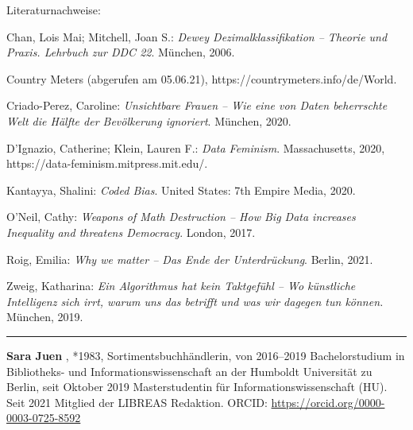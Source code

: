 \documentclass[a4paper,
fontsize=11pt,
oneside,
numbers=noperiodatend,
parskip=half-,
bibliography=totoc,
final
]{scrartcl}
\begin{document}
Literaturnachweise:

Chan, Lois Mai; Mitchell, Joan S.: \emph{Dewey Dezimalklassifikation --
Theorie und Praxis. Lehrbuch zur DDC 22}. München, 2006.

Country Meters (abgerufen am 05.06.21),
https://countrymeters.info/de/World.

Criado-Perez, Caroline: \emph{Unsichtbare Frauen -- Wie eine von Daten
beherrschte Welt die Hälfte der Bevölkerung ignoriert}. München, 2020.

D'Ignazio, Catherine; Klein, Lauren F.: \emph{Data Feminism}.
Massachusetts, 2020, \linebreak https://data-feminism.mitpress.mit.edu/.

Kantayya, Shalini: \emph{Coded Bias}. United States: 7th Empire Media,
2020.

O'Neil, Cathy: \emph{Weapons of Math Destruction -- How Big Data
increases Inequality and threatens Democracy}. London, 2017.

Roig, Emilia: \emph{Why we matter -- Das Ende der Unterdrückung}.
Berlin, 2021.

Zweig, Katharina: \emph{Ein Algorithmus hat kein Taktgefühl -- Wo
künstliche Intelligenz sich irrt, warum uns das betrifft und was wir
dagegen tun können.} München, 2019.

\begin{center}\rule{0.5\linewidth}{0.5pt}\end{center}

\textbf{Sara Juen} , *1983, Sortimentsbuchhändlerin, von 2016--2019
Bachelorstudium in Bibliotheks- und Informationswissenschaft an der
Humboldt Universität zu Berlin, seit Oktober 2019 Masterstudentin für
Informationswissenschaft (HU). Seit 2021 Mitglied der LIBREAS Redaktion.
ORCID: \url{https://orcid.org/0000-0003-0725-8592}
\end{document}
